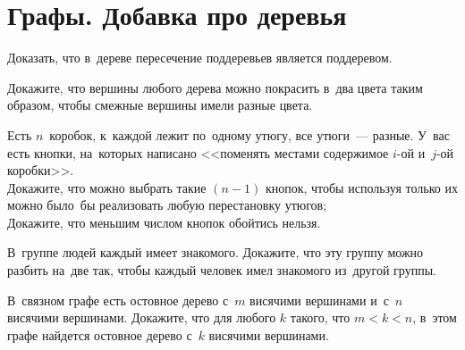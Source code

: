 
\section*{Графы. Добавка про деревья}


\begin{problems}

\item
Доказать, что в~дереве пересечение поддеревьев является поддеревом.

\item
Докажите, что вершины любого дерева можно покрасить в~два цвета таким образом,
чтобы смежные вершины имели разные цвета.

\item
Есть $n$~коробок, к~каждой лежит по~одному утюгу, все утюги~--- разные.
У~вас есть кнопки, на~которых написано
<<поменять местами содержимое $i$-ой и~$j$-ой коробки>>.
\\
\subproblem
Докажите, что можно выбрать такие $(n - 1)$ кнопок, чтобы используя только их
можно было~бы реализовать любую перестановку утюгов;
\\
\subproblem
Докажите, что меньшим числом кнопок обойтись нельзя.

\item
В~группе людей каждый имеет знакомого.
Докажите, что эту группу можно разбить на~две так, чтобы каждый человек имел
знакомого из~другой группы.

\item
В~связном графе есть остовное дерево с~$m$ висячими вершинами и~с~$n$ висячими
вершинами.
Докажите, что для любого $k$ такого, что $m < k < n$, в~этом графе найдется
остовное дерево с~$k$ висячими вершинами.

\end{problems}

